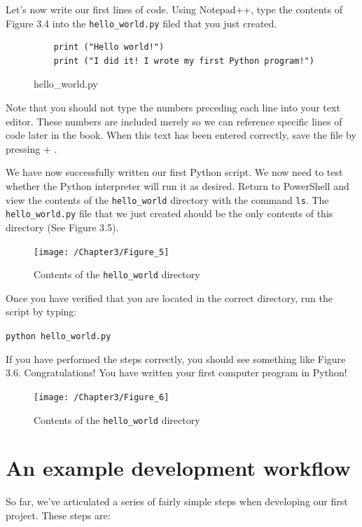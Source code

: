 \documentclass{book}
\begin{document}
Let's now write our first lines of code. Using Notepad++, type the contents of Figure 3.4 into the \texttt{hello\_world.py} filed that you just created.

\begin{figure}[h]
	\caption{hello\_world.py}
	\begin{lstlisting}
	print ("Hello world!")
	print ("I did it! I wrote my first Python program!")
	\end{lstlisting}
\end{figure}

Note that you should not type the numbers preceding each line into your text editor. These numbers are included merely so we can reference specific lines of code later in the book. When this text has been entered correctly, save the file by pressing  + . 

We have now successfully written our first Python script. We now need to test whether the Python interpreter will run it as desired. Return to PowerShell and view the contents of the \texttt{hello\_world} directory with the command \texttt{ls}. The \texttt{hello\_world.py} file that we just created should be the only contents of this directory (See Figure 3.5).\\

\begin{figure}[h]
	\caption{Contents of the \texttt{hello\_world} directory}
	\centering\texttt{[image: /Chapter3/Figure\_5]}
\end{figure}

Once you have verified that you are located in the correct directory, run the script by typing:

\texttt{python hello\_world.py}

If you have performed the steps correctly, you should see something like Figure 3.6. Congratulations! You have written your first computer program in Python!

\begin{figure}[h]
	\caption{Contents of the \texttt{hello\_world} directory}
	\centering\texttt{[image: /Chapter3/Figure\_6]}
\end{figure}

\section{An example development workflow}

So far, we've articulated a series of fairly simple steps when developing our first project. These steps are:
\end{document}
